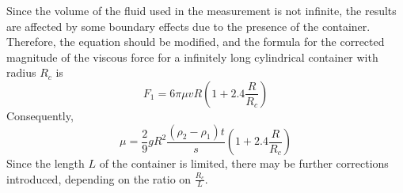 Since the volume of the fluid used in the measurement is not infinite, the
results are affected by some boundary effects due to the presence of the
container.
Therefore, the equation should be modified, and the formula for the
corrected magnitude of the viscous force for a infinitely long cylindrical
container with radius $R_c$ is 
$$  F_1 = 6 \pi \mu v R (1 + 2.4 \frac{R}{R_c})  $$
Consequently,
$$ \mu = \frac{2}{9} g R^2 \frac{( \rho_2 - \rho_1 ) t  }{s} (1 + 2.4
\frac{R}{R_c})  $$
Since the length $L$ of the container is limited, there may be further
corrections introduced, depending on the ratio on $\frac{R_c}{L}$. 






